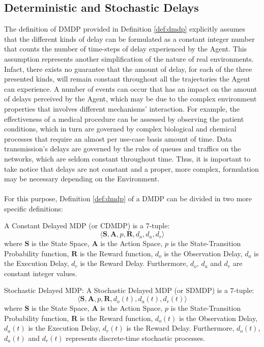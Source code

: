         \subsection{Deterministic and Stochastic Delays}
        \label{sub:dmdp_stochdelays}
            The definition of DMDP provided in Definition \ref{def:dmdp} explicitly assumes that the different kinds of delay can be formulated as a constant integer number that counts the number of time-steps of delay experienced by the Agent. This assumption represents another simplification of the nature of real environments. Infact, there exists no guarantee that the amount of delay, for each of the three presented kinds, will remain constant throughout all the trajectories the Agent can experience. \newline
            A number of events can occur that has an impact on the amount of delays perceived by the Agent, which may be due to the complex environment properties that involves different mechanisms' interaction. For example, the effectiveness of a medical procedure can be assessed by observing the patient conditions, which in turn are governed by complex biological and chemical processes that require an almost per use-case basis amount of time. Data transmission's delays are governed by the rules of queues and traffics on the networks, which are seldom constant throughout time. Thus, it is important to take notice that delays are not constant and a proper, more complex, formulation may be necessary depending on the Environment. 
            \\\\
            For this purpose, Definition \ref{def:dmdp} of a DMDP can be divided in two more specific definitions:
            
            \begin{definition}
                \label{def:cdmdp}
                A Constant Delayed MDP (or CDMDP) is a 7-tuple:
                \[ \langle \mathbf{S}, \mathbf{A}, p, \mathbf{R}, d_o, d_a, d_r \rangle\]
                where $\mathbf{S}$ is the State Space, $\mathbf{A}$ is the Action Space, $p$ is the State-Transition Probability function, $\mathbf{R}$ is the Reward function, $d_o$ is the Observation Delay, $d_a$ is the Execution Delay, $d_r$ is the Reward Delay. Furthermore, $d_o$, $d_a$ and $d_r$ are constant integer values.
            \end{definition}
            
            \begin{definition}{Stochastic Delayed MDP: }
                \label{def:sdmdp}
                A Stochastic Delayed MDP (or SDMDP) is a 7-tuple:
                \[ \langle \mathbf{S}, \mathbf{A}, p, \mathbf{R}, d_o(t), d_a(t), d_r(t) \rangle\]
                where $\mathbf{S}$ is the State Space, $\mathbf{A}$ is the Action Space, $p$ is the State-Transition Probability function, $\mathbf{R}$ is the Reward function, $d_o(t)$ is the Observation Delay, $d_a(t)$ is the Execution Delay, $d_r(t)$ is the Reward Delay. Furthermore, $d_o(t)$, $d_a(t)$ and $d_r(t)$ represents discrete-time stochastic processes.
            \end{definition}
            
